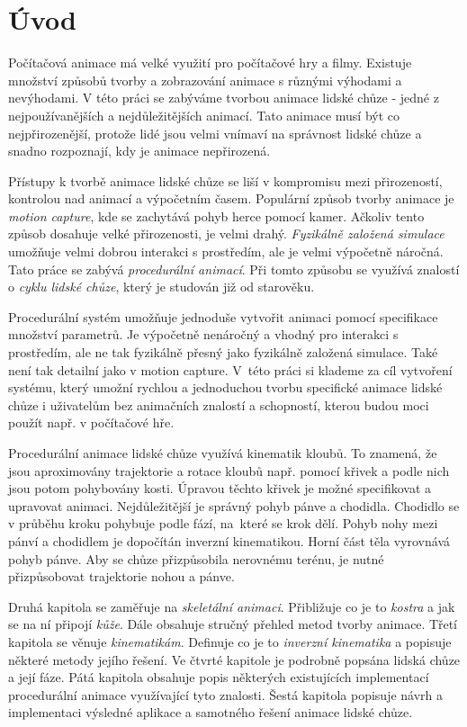 
\chapter{Úvod}
Počítačová animace má velké využití pro počítačové hry a filmy. Existuje množství způsobů tvorby a zobrazování animace s různými výhodami a nevýhodami. V této práci se zabýváme tvorbou animace lidské chůze - jedné z nejpoužívanějších a nejdůležitějších animací. Tato animace musí být co nejpřirozenější, protože lidé jsou velmi vnímaví na správnost lidské chůze a snadno rozpoznají, kdy je animace nepřirozená.

Přístupy k tvorbě animace lidské chůze se liší v kompromisu mezi přirozeností, kontrolou nad animací a výpočetním časem. Populární způsob tvorby animace je \textit{motion capture}, kde se zachytává pohyb herce pomocí kamer. Ačkoliv tento způsob dosahuje velké přirozenosti, je velmi drahý. \textit{Fyzikálně založená simulace} umožňuje velmi dobrou interakci s prostředím, ale je velmi výpočetně náročná. Tato práce se zabývá \textit{procedurální animací}. Při tomto způsobu se využívá znalostí o \textit{cyklu lidské chůze}, který je studován již od starověku. 

Procedurální systém umožňuje jednoduše vytvořit animaci pomocí specifikace množství parametrů. Je výpočetně nenáročný a vhodný pro interakci s prostředím, ale ne tak fyzikálně přesný jako fyzikálně založená simulace. Také není tak detailní jako v motion capture.  V~této práci si klademe za cíl vytvoření systému, který umožní rychlou a jednoduchou tvorbu specifické animace lidské chůze i uživatelům bez animačních znalostí a schopností, kterou budou moci použít např. v počítačové hře. 

Procedurální animace lidské chůze využívá kinematik kloubů. To znamená, že jsou aproximovány trajektorie a rotace kloubů např. pomocí křivek a podle nich jsou potom pohybovány kosti. Úpravou těchto křivek je možné specifikovat a upravovat animaci. Nejdůležitější je správný pohyb pánve a chodidla. Chodidlo se v průběhu kroku pohybuje podle fází, na~které se krok dělí. Pohyb nohy mezi pánví a chodidlem je dopočítán inverzní kinematikou. Horní část těla vyrovnává pohyb pánve. Aby se chůze přizpůsobila nerovnému terénu, je nutné přizpůsobovat trajektorie nohou a pánve. 

Druhá kapitola se zaměřuje na \textit{skeletální animaci}. Přibližuje co je to \textit{kostra} a jak se na ní připojí \textit{kůže}. Dále obsahuje stručný přehled metod tvorby animace. Třetí kapitola se věnuje \textit{kinematikám}. Definuje co je to \textit{inverzní kinematika} a popisuje některé metody jejího řešení. Ve čtvrté kapitole je podrobně popsána lidská chůze a její fáze. Pátá kapitola obsahuje popis některých existujících implementací procedurální animace využívající tyto znalosti. Šestá kapitola popisuje návrh a implementaci výsledné aplikace a samotného řešení animace lidské chůze.

